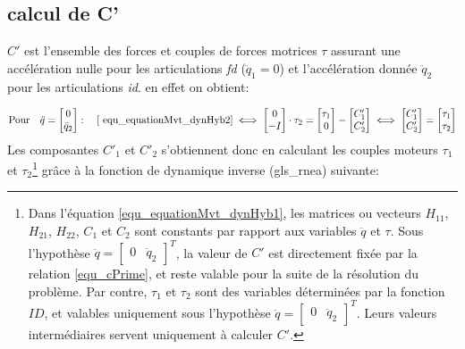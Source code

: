 \documentclass{report}
\begin{document}
\subsection{calcul de C'}

$C'$ est l'ensemble des forces et couples de forces motrices $\tau$ assurant une accélération nulle pour les articulations \emph{fd} ($\ddot{q}_1=0$) et l'accélération donnée $\ddot{q}_2$ pour les articulations \emph{id}. en effet on obtient:

\begin{equation}
\textnormal{Pour} \quad \ddot{q}=
\begin{bmatrix}
  0 \\
  \ddot{q}_2
\end{bmatrix}
: \quad
\eqref{   equ_equationMvt_dynHyb2} \iff
\begin{bmatrix}
  0 \\
  -I
\end{bmatrix} 
\cdot \tau_2
=
\begin{bmatrix}
  \tau_1 \\
  0
\end{bmatrix} 
-
\begin{bmatrix}
  C'_1 \\
  C'_2
\end{bmatrix}
\iff
\begin{bmatrix}
  C'_1 \\
  C'_2
\end{bmatrix}
=
\begin{bmatrix}
  \tau_1 \\
  \tau_2
\end{bmatrix} 
\end{equation}
\medskip
Les composantes $C'_1$ et $C'_2$ s'obtiennent donc en calculant les couples moteurs $\tau_1$ et $\tau_2$\footnote{%
Dans l'équation \eqref{equ_equationMvt_dynHyb1}, les matrices ou vecteurs $H_{11}$, $H_{21}$, $H_{22}$, $C_1$ et $C_2$ sont constants par rapport aux variables $\ddot{q}$ et $\tau$. Sous l'hypothèse \(\ddot{q}=\begin{bmatrix} 0 & \ddot{q}_2\end{bmatrix}^T\), la valeur de $C'$ est directement fixée par la relation \eqref{equ_cPrime}, et reste valable pour la suite de la résolution du problème. Par contre, $\tau_1$ et $\tau_2$ sont des variables déterminées par la fonction $ID$, et valables uniquement sous l'hypothèse \(\ddot{q}=\begin{bmatrix} 0 & \ddot{q}_2\end{bmatrix}^T\). Leurs valeurs intermédiaires servent uniquement à calculer $C'$.%
} grâce à la fonction de dynamique inverse (\gls{gls_rnea}) suivante:
\end{document}
